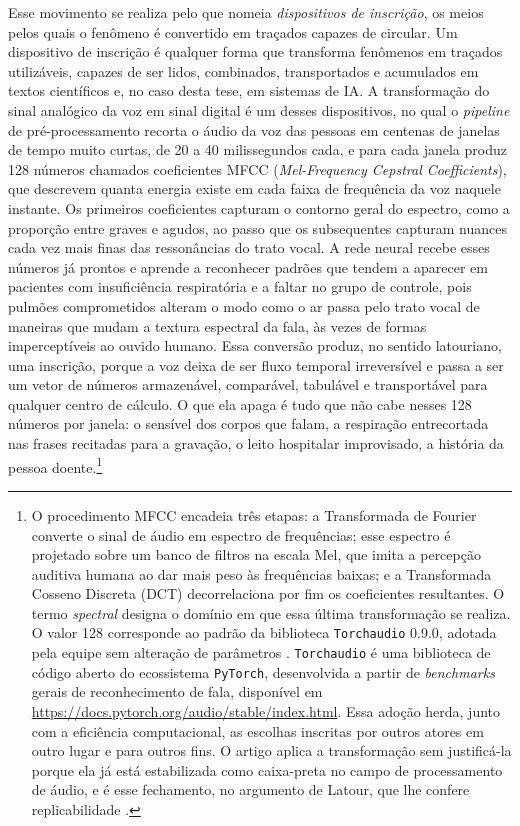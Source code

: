 Esse movimento se realiza pelo que \textcite{Latour2011CienciaEmAcao} nomeia \textit{dispositivos de inscrição}, os meios pelos quais o fenômeno é convertido em traçados capazes de circular. Um dispositivo de inscrição é qualquer forma que transforma fenômenos em traçados utilizáveis, capazes de ser lidos, combinados, transportados e acumulados em textos científicos e, no caso desta tese, em sistemas de IA. A transformação do sinal analógico da voz em sinal digital é um desses dispositivos, no qual o \emph{pipeline} de pré-processamento recorta o áudio da voz das pessoas em centenas de janelas de tempo muito curtas, de 20 a 40 milissegundos cada, e para cada janela produz 128 números chamados coeficientes MFCC (\emph{Mel-Frequency Cepstral Coefficients}), que descrevem quanta energia existe em cada faixa de frequência da voz naquele instante. Os primeiros coeficientes capturam o contorno geral do espectro, como a proporção entre graves e agudos, ao passo que os subsequentes capturam nuances cada vez mais finas das ressonâncias do trato vocal. A rede neural recebe esses números já prontos e aprende a reconhecer padrões que tendem a aparecer em pacientes com insuficiência respiratória e a faltar no grupo de controle, pois pulmões comprometidos alteram o modo como o ar passa pelo trato vocal de maneiras que mudam a textura espectral da fala, às vezes de formas imperceptíveis ao ouvido humano. Essa conversão produz, no sentido latouriano, uma inscrição, porque a voz deixa de ser fluxo temporal irreversível e passa a ser um vetor de números armazenável, comparável, tabulável e transportável para qualquer centro de cálculo. O que ela apaga é tudo que não cabe nesses 128 números por janela: o sensível dos corpos que falam, a respiração entrecortada nas frases recitadas para a gravação, o leito hospitalar improvisado, a história da pessoa doente.\footnote{O procedimento MFCC encadeia três etapas: a Transformada de Fourier converte o sinal de áudio em espectro de frequências; esse espectro é projetado sobre um banco de filtros na escala Mel, que imita a percepção auditiva humana ao dar mais peso às frequências baixas; e a Transformada Cosseno Discreta (DCT) decorrelaciona por fim os coeficientes resultantes. O termo \emph{spectral} designa o domínio em que essa última transformação se realiza. O valor 128 corresponde ao padrão da biblioteca \texttt{Torchaudio} 0.9.0, adotada pela equipe sem alteração de parâmetros \parencite{Casanova2021DeepLearning, Gauy2021MFCC}. \texttt{Torchaudio} é uma biblioteca de código aberto do ecossistema \texttt{PyTorch}, desenvolvida a partir de \emph{benchmarks} gerais de reconhecimento de fala, disponível em \url{https://docs.pytorch.org/audio/stable/index.html}. Essa adoção herda, junto com a eficiência computacional, as escolhas inscritas por outros atores em outro lugar e para outros fins. O artigo aplica a transformação sem justificá-la porque ela já está estabilizada como caixa-preta no campo de processamento de áudio, e é esse fechamento, no argumento de Latour, que lhe confere replicabilidade \parencite{Latour2011CienciaEmAcao}.}


